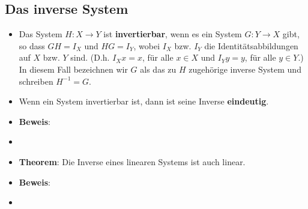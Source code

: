 \documentclass[11pt]{article}
\begin{document}
\subsection*{Das inverse System}
\vspace*{-0.5cm}
\begin{itemize}[leftmargin=0pt]
    \item[] Das System $H:X \to Y$ ist \textbf{invertierbar}, wenn es ein System $G:Y \to X$ gibt, so dass $GH = I_X$ und $HG = I_Y$, wobei $I_X$ bzw. $I_Y$ die Identitätsabbildungen auf $X$ bzw. $Y$ sind. (D.h. $I_X x = x$, für alle $x\in X$ und $I_Y y= y$, für alle $y \in Y$.) In diesem Fall bezeichnen wir $G$ als das zu $H$ zugehörige inverse System und schreiben $H^{-1} = G$.
    \item[] Wenn ein System invertierbar ist, dann ist seine Inverse \textbf{eindeutig}.
    \item[] \textbf{Beweis}:
    \item[] 
    \item[] \textbf{Theorem}: Die Inverse eines linearen Systems ist auch linear.
    \item[] \textbf{Beweis}:
    \item[] 
\end{itemize}

\vfill \null
\pagebreak
\end{document}
